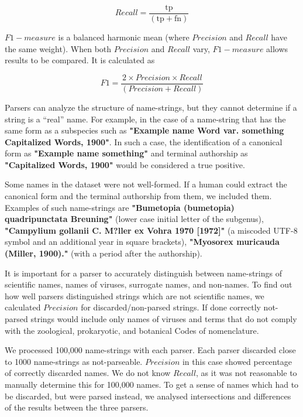 \documentclass{bmcart}
\begin{document}
\[Recall = \dfrac{\text{tp}}{(\text{tp} + \text{fn})}\]

$F1-measure$ is a balanced harmonic mean (where $Precision$ and $Recall$ have
the same weight). When both $Precision$ and $Recall$ vary, $F1-measure$ allows
results to be compared. It is calculated as

\[F1 = \dfrac{2 \times Precision \times Recall}{(Precision + Recall)}\]

Parsers can analyze the structure of name-strings, but they cannot determine if
a string is a ``real'' name. For example, in the case of a name-string that has
the same form as a subspecies such as \textbf{"Example name Word var. something
Capitalized Words, 1900"}. In such a case, the identification of a canonical
form as \textbf{"Example name something"} and terminal authorship as
\textbf{"Capitalized Words, 1900"} would be considered a true positive.

Some names in the dataset were not well-formed. If a human could extract the
canonical form and the terminal authorship from them, we included them.
Examples of such name-strings are \textbf{"Bumetopia (bumetopia) quadripunctata
Breuning"} (lower case initial letter of the subgenus), \textbf{"Campylium
gollanii C. M?ller ex Vohra 1970 [1972]"} (a miscoded UTF-8 symbol and an
additional year in square brackets), \textbf{"Myosorex muricauda (Miller,
1900)."} (with a period after the authorship).

It is important for a parser to accurately distinguish between name-strings of
scientific names, names of viruses, surrogate names, and non-names. To find out
how well parsers distinguished strings which are not scientific names, we
calculated $Precision$ for discarded/non-parsed strings. If done correctly
not-parsed strings would include only names of viruses and terms that do not
comply with the zoological, prokaryotic, and botanical Codes of nomenclature.

 We processed 100,000 name-strings with
each parser.  Each parser discarded close to 1000 name-strings as
not-parseable.  $Precision$ in this case showed percentage of correctly
discarded names.  We do not know $Recall$, as it was not reasonable to manually
determine this for 100,000 names. To get a sense of names which had to be
discarded, but were parsed instead, we analysed intersections and differences
of the results between the three parsers.
\end{document}
